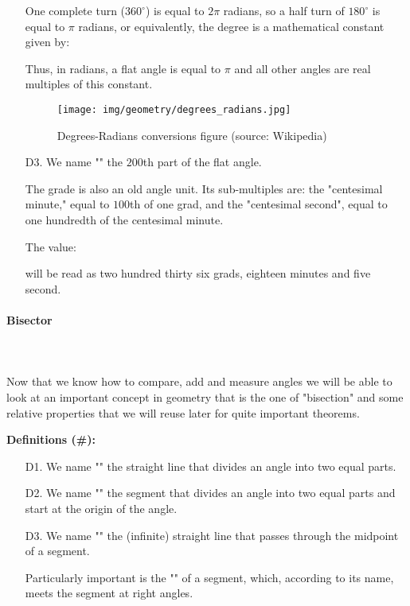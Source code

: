 \begin{enumerate}
		One complete turn ($360^\circ $) is equal to $2\pi$ radians, so a half turn of $180^\circ$ is equal to $\pi$ radians, or equivalently, the degree is a mathematical constant given by:
		
		Thus, in radians, a flat angle is equal to $\pi$ and all other angles are real multiples of this constant.
		\begin{figure}[H]
			\centering
			\texttt{[image: img/geometry/degrees\_radians.jpg]}
			\caption[Degrees-Radians conversions figure]{Degrees-Radians conversions figure (source: Wikipedia)}
		\end{figure}

		\item[D3.] We name "" the $200$th part of the flat angle.
		
		The grade is also an old angle unit. Its sub-multiples are: the "centesimal minute," equal to $100$th of one grad, and the "centesimal second", equal to one hundredth of the centesimal minute.
		
		The value:
		
		 will be read as two hundred thirty six grads, eighteen  minutes and five second.
	\end{enumerate}
	
	\pagebreak
	\paragraph{Bisector}\mbox{}\\\\
	Now that we know how to compare, add and measure angles we will be able to look at an important concept in geometry that is the one of "bisection" and some relative properties that we will reuse later for quite important theorems.

	\textbf{Definitions (\#\mydef):}
	\begin{enumerate}
		\item[D1.] We name "" the straight line that divides an angle into two equal parts.

		\item[D2.] We name ""  the segment that divides an angle into two equal parts and start at the origin of the angle.

		\item[D3.] We name "" the (infinite) straight line that passes through the midpoint of a segment.

		Particularly important is the "" of a segment, which, according to its name, meets the segment at right angles. 
	\end{enumerate}
	
